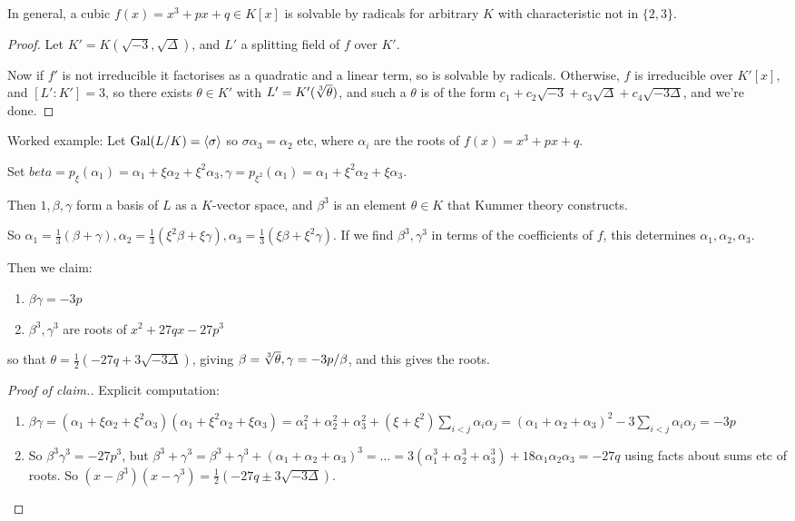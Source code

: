 \documentclass[10pt,a4paper]{article}
\begin{document}
In general, a cubic $f(x) = x^3 + px + q \in K[x]$ is solvable by radicals for arbitrary $K$ with characteristic not in $\{2,3\}$.

\begin{proof}
Let $K' = K(\sqrt{-3}, \sqrt{\Delta})$, and $L'$ a splitting field of $f$ over $K'$.

Now if $f'$ is not irreducible it factorises as a quadratic and a linear term, so is solvable by radicals. Otherwise, $f$ is irreducible over $K'[x]$, and $[L':K'] = 3$, so there exists $\theta \in K'$ with $L' = K'(\sqrt[3]{\theta})$, and such a $\theta$ is of the form $c_1 + c_2\sqrt{-3} +c_3\sqrt{\Delta} + c_4\sqrt{-3\Delta}$, and we're done.
\end{proof}

Worked example: Let $\operatorname{Gal}(L/K) = \langle \sigma \rangle$ so $\sigma \alpha_3 = \alpha_2$ etc, where $\alpha_i$ are the roots of $f(x) = x^3+px+q$.

Set $beta = p_\xi(\alpha_1) = \alpha_1 + \xi \alpha_2 + \xi^2 \alpha_3, \gamma = p_{\xi^2}(\alpha_1) = \alpha_1 + \xi^2 \alpha_2 + \xi \alpha_3$.

Then $1, \beta, \gamma$ form a basis of $L$ as a $K$-vector space, and $\beta^3$ is an element $\theta \in K$ that Kummer theory constructs.

So $\alpha_1 = \frac{1}{3}(\beta+\gamma), \alpha_2 = \frac{1}{3}(\xi^2\beta + \xi\gamma), \alpha_3 = \frac{1}{3}(\xi\beta + \xi^2\gamma)$. If we find $\beta^3, \gamma^3$ in terms of the coefficients of $f$, this determines $\alpha_1, \alpha_2, \alpha_3$.

Then we claim:
\begin{enumerate}
\item $\beta \gamma = -3p$
\item $\beta^3, \gamma^3$ are roots of $x^2+27qx-27p^3$
\end{enumerate}
so that $\theta = \frac{1}{2}(-27q+3\sqrt{-3\Delta})$, giving $\beta = \sqrt[3]{\theta}, \gamma = -3p/\beta$, and this gives the roots.

\begin{proof}[Proof of claim.]
Explicit computation:
\begin{enumerate}
\item $\beta\gamma = (\alpha_1 + \xi \alpha_2+ \xi^2\alpha_3)(\alpha_1+\xi^2\alpha_2+\xi\alpha_3) = \alpha_1^2 + \alpha_2^2 + \alpha_3^2 + (\xi+\xi^2)\sum_{i<j}\alpha_i\alpha_j = (\alpha_1+\alpha_2+\alpha_3)^2 - 3\sum_{i<j} \alpha_i\alpha_j = -3p$

\item So $\beta^3\gamma^3 = -27p^3$, but $\beta^3+\gamma^3 = \beta^3+\gamma^3 + (\alpha_1+\alpha_2+\alpha_3)^3 = \ldots = 3(\alpha_1^3+\alpha_2^3+\alpha_3^3) + 18\alpha_1\alpha_2\alpha_3 = -27q$ using facts about sums etc of roots. So $(x-\beta^3)(x-\gamma^3) = \frac{1}{2}(-27q \pm 3\sqrt{-3\Delta})$.
\end{enumerate}
\end{proof}
\end{document}
